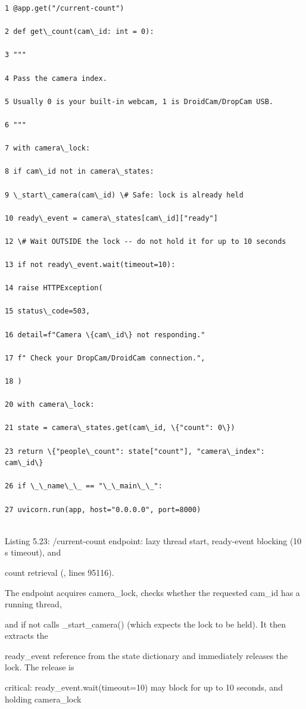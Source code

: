 \begin{listingbox}
	\begin{verbatim}
1 @app.get("/current-count")

2 def get\_count(cam\_id: int = 0):

3 """

4 Pass the camera index.

5 Usually 0 is your built-in webcam, 1 is DroidCam/DropCam USB.

6 """

7 with camera\_lock:

8 if cam\_id not in camera\_states:

9 \_start\_camera(cam\_id) \# Safe: lock is already held

10 ready\_event = camera\_states[cam\_id]["ready"]

12 \# Wait OUTSIDE the lock -- do not hold it for up to 10 seconds

13 if not ready\_event.wait(timeout=10):

14 raise HTTPException(

15 status\_code=503,

16 detail=f"Camera \{cam\_id\} not responding."

17 f" Check your DropCam/DroidCam connection.",

18 )

20 with camera\_lock:

21 state = camera\_states.get(cam\_id, \{"count": 0\})

23 return \{"people\_count": state["count"], "camera\_index": cam\_id\}

26 if \_\_name\_\_ == "\_\_main\_\_":

27 uvicorn.run(app, host="0.0.0.0", port=8000)


\end{verbatim}
\end{listingbox}
Listing 5.23: /current-count endpoint: lazy thread start, ready-event blocking (10 s timeout), and

count retrieval (, lines 95116).

The endpoint acquires camera\_lock, checks whether the requested cam\_id has a running thread,

and if not calls \_start\_camera() (which expects the lock to be held). It then extracts the

ready\_event reference from the state dictionary and immediately releases the lock. The release is

critical: ready\_event.wait(timeout=10) may block for up to 10 seconds, and holding camera\_lock

